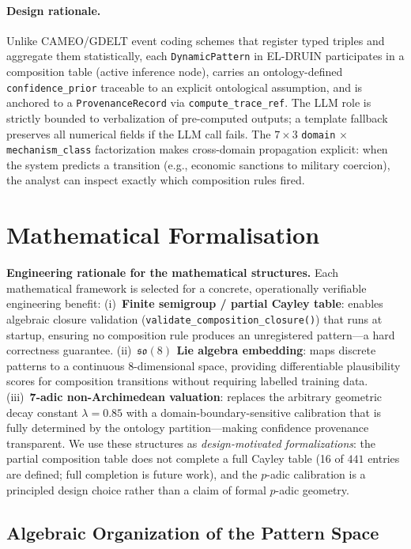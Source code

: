 \documentclass{llncs}
\begin{document}
\paragraph{Design rationale.}
Unlike CAMEO/GDELT event coding schemes that register typed triples and aggregate
them statistically, each \texttt{DynamicPattern} in EL-DRUIN participates in a
composition table (active inference node), carries an ontology-defined
\texttt{confidence\_prior} traceable to an explicit ontological assumption, and is
anchored to a \texttt{ProvenanceRecord} via \texttt{compute\_trace\_ref}.
The LLM role is strictly bounded to verbalization of pre-computed outputs;
a template fallback preserves all numerical fields if the LLM call fails.
The $7 \times 3$ \texttt{domain} $\times$ \texttt{mechanism\_class} factorization
makes cross-domain propagation explicit: when the system predicts a transition
(e.g., economic sanctions to military coercion), the analyst can inspect exactly
which composition rules fired.

\section{Mathematical Formalisation}

\noindent\textbf{Engineering rationale for the mathematical structures.}
Each mathematical framework is selected for a concrete, operationally verifiable
engineering benefit:
(i)~\textbf{Finite semigroup / partial Cayley table}: enables algebraic closure
validation (\texttt{validate\_composition\_closure()}) that runs at startup, ensuring
no composition rule produces an unregistered pattern---a hard correctness guarantee.
(ii)~\textbf{$\mathfrak{so}(8)$ Lie algebra embedding}: maps discrete patterns to a
continuous 8-dimensional space, providing differentiable plausibility scores for
composition transitions without requiring labelled training data.
(iii)~\textbf{7-adic non-Archimedean valuation}: replaces the arbitrary geometric decay
constant $\lambda = 0.85$ with a domain-boundary-sensitive calibration that is fully
determined by the ontology partition---making confidence provenance transparent.
We use these structures as \emph{design-motivated formalizations}: the partial
composition table does not complete a full Cayley table (16 of $441$ entries are
defined; full completion is future work), and the $p$-adic calibration is a
principled design choice rather than a claim of formal $p$-adic geometry.

\subsection{Algebraic Organization of the Pattern Space}
\label{sec:pattern-algebra}
\end{document}

